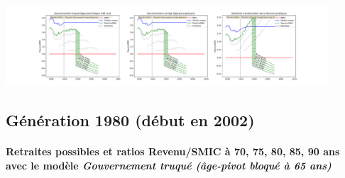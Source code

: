  \begin{center}\includegraphics[width=0.9\textwidth]{fig/Redacteur_1975_22_dest_retraite.pdf}\end{center} \label{fig/Redacteur_1975_22_dest_retraite.pdf} 

\newpage 
 
\subsection{Génération 1980 (début en 2002)} 

\paragraph{Retraites possibles et ratios Revenu/SMIC à 70, 75, 80, 85, 90 ans avec le modèle \emph{Gouvernement truqué (âge-pivot bloqué à 65 ans)}}  
 
